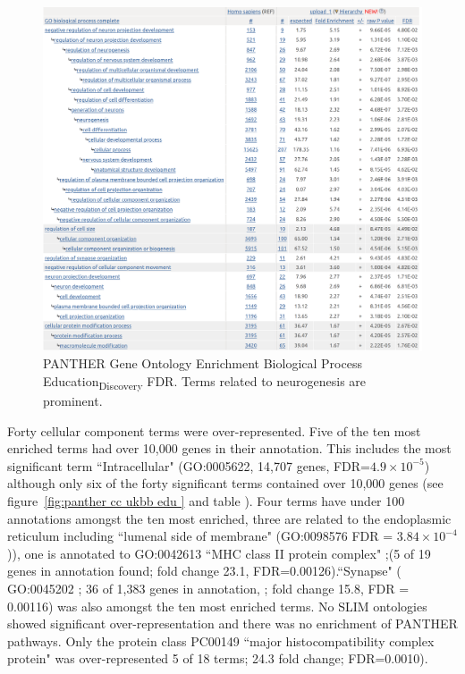     \begin{figure}
                \centering
                \includegraphics[width=\textwidth]{images/chapter2/large_screenshots/edu_discovery_bp_allbg_panther.png}
                \caption[PANTHER GO Enrichment Education Discovery Biological Process]{PANTHER Gene Ontology Enrichment Biological Process Education\textsubscript{Discovery} FDR. Terms related to neurogenesis are prominent.}
                \label{fig:panther bp ukbb edu fdr}
            \end{figure}
            
            
    Forty cellular component terms were over-represented.  Five of the ten most enriched terms had over 10,000 genes in their annotation. This includes the most significant term ``Intracellular" (GO:0005622, 14,707 genes, FDR=$4.9\times10^{-5}$) although only six of the forty significant terms contained over 10,000 genes (see figure~\ref{fig:panther cc ukbb edu } and table \label{tab:GO cellular component complete Education Discovery FDRover represenation only}). Four terms have under 100 annotations amongst the ten most enriched, three are related to the endoplasmic reticulum  including  ``lumenal side of membrane" (GO:0098576 FDR =   $3.84\times10^{-4}$)), one is annotated to GO:0042613 ``MHC class II protein complex" ;(5 of 19 genes in annotation found;  fold change 23.1, FDR=0.00126).``Synapse" ( GO:0045202  ;   36 of 1,383 genes in annotation,    ; fold change 15.8,  FDR = 0.00116) was also amongst the ten most enriched terms.     No SLIM ontologies showed significant over-representation and there was no enrichment of PANTHER pathways. Only the protein class PC00149 ``major histocompatibility complex protein" was over-represented  5 of 18 terms; 24.3 fold change; FDR=0.0010).

